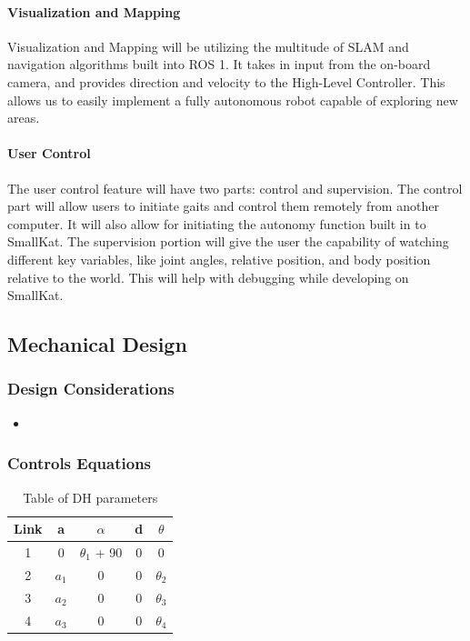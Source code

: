 \paragraph*{Visualization and Mapping}
Visualization and Mapping will be utilizing the multitude of SLAM and navigation algorithms built into ROS 1. It takes in input from the on-board camera, and provides direction and velocity to the High-Level Controller. This allows us to easily implement a fully autonomous robot capable of exploring new areas.

\paragraph*{User Control}
The user control feature will have two parts: control and supervision. The control part will allow users to initiate gaits and control them remotely from another computer. It will also allow for initiating the autonomy function built in to SmallKat. The supervision portion will give the user the capability of watching different key variables, like joint angles, relative position, and body position relative to the world. This will help with debugging while developing on SmallKat.
\subsection{Mechanical Design}
    \subsubsection{Design Considerations}
            \begin{itemize} %
            \item 
            \end{itemize}
     \subsubsection{Controls Equations}
     \begin{table}[H]
        \centering
        \begin{tabular}{|c|c|c|c|c|}
        \hline
            Link & a & $\alpha$ & d & $\theta$ \\
            \hline
            1 & 0 & $\theta_1$ + 90& 0& 0\\
            2 & $a_1$ & 0 & 0 &$\theta_2$ \\
            3 & $a_2$ & 0 & 0 &$\theta_3$ \\
            4 & $a_3$ & 0 & 0 &$\theta_4$ \\
            \hline
            \end{tabular}
        \caption{Table of DH parameters}
        \label{tab:my_label}
    \end{table}
    
